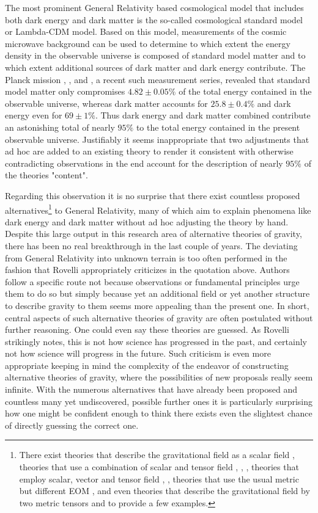 The most prominent General Relativity based cosmological model that includes both dark energy and dark matter is the so-called cosmological standard model or Lambda-CDM model. Based on this model, measurements of the cosmic microwave background can be used to determine to which extent the energy density in the observable universe is composed of standard model matter and to which extent additional sources of dark matter and dark energy contribute. The Planck mission \cite{Planck13_1}, \cite{Planck13_2}, \cite{Planck15} and \cite{Planck18}, a recent such measurement series, revealed that standard model matter only compromises $4.82\pm0.05\%$ of the total energy contained in the observable universe, whereas dark matter accounts for $ 25.8\pm0.4\%$ and dark energy even for $ 69 \pm 1 \%$. Thus dark energy and dark matter combined contribute an astonishing total of nearly $95 \%$ to the total energy contained in the present observable universe.
Justifiably it seems inappropriate that two adjustments that ad hoc are added to an existing theory to render it consistent with otherwise contradicting observations in the end account for the description of nearly $95\%$ of the theories "content".  

Regarding this observation it is no surprise that there exist countless proposed alternatives\footnote{There exist theories that describe the gravitational field as a scalar field \cite{Scalar1} \cite{Scalar2}, theories that use a combination of scalar and tensor field \cite{ST1}, \cite{ST2}, \cite{ST3}, theories that employ scalar, vector and tensor field \cite{SVT1}, \cite{SVT2}, theories that use the usual metric but different EOM \cite{fR1}, \cite{fR2} and even theories that describe the gravitational field by two metric tensors \cite{BIM1} and \cite{BIM2} to provide a few examples.} to General Relativity, many of which aim to explain phenomena like dark energy and dark matter without ad hoc adjusting the theory by hand. 
Despite this large output in this research area of alternative theories of gravity, there has been no real breakthrough in the last couple of years. 
The deviating from General Relativity into unknown terrain is too often performed in the fashion that Rovelli appropriately criticizes in the quotation above. Authors follow a specific route not because observations or fundamental principles urge them to do so but simply because yet an additional field or yet another structure to describe gravity to them seems more appealing than the present one. In short, central aspects of such alternative theories of gravity are often postulated without further reasoning. One could even say these theories are guessed. As Rovelli strikingly notes, this is not how science has progressed in the past, and certainly not how science will progress in the future. Such criticism is even more appropriate keeping in mind the complexity of the endeavor of constructing alternative theories of gravity, where the possibilities of new proposals really seem infinite.
With the numerous alternatives that have already been proposed and countless many yet undiscovered, possible further ones it is particularly surprising how one might be confident enough to think there exists even the slightest chance of directly guessing the correct one. 

